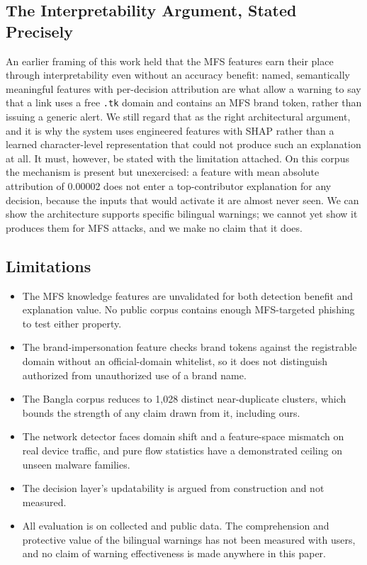 \documentclass[preprint,12pt,number]{elsarticle}
\begin{document}
\subsection{The Interpretability Argument, Stated Precisely}
An earlier framing of this work held that the MFS features earn their place through interpretability even without an accuracy benefit: named, semantically meaningful features with per-decision attribution are what allow a warning to say that a link uses a free \texttt{.tk} domain and contains an MFS brand token, rather than issuing a generic alert. We still regard that as the right architectural argument, and it is why the system uses engineered features with SHAP rather than a learned character-level representation that could not produce such an explanation at all. It must, however, be stated with the limitation attached. On this corpus the mechanism is present but unexercised: a feature with mean absolute attribution of 0.00002 does not enter a top-contributor explanation for any decision, because the inputs that would activate it are almost never seen. We can show the architecture supports specific bilingual warnings; we cannot yet show it produces them for MFS attacks, and we make no claim that it does.

\subsection{Limitations}
\begin{itemize}
\item The MFS knowledge features are unvalidated for both detection benefit and explanation value. No public corpus contains enough MFS-targeted phishing to test either property.
\item The brand-impersonation feature checks brand tokens against the registrable domain without an official-domain whitelist, so it does not distinguish authorized from unauthorized use of a brand name.
\item The Bangla corpus reduces to 1{,}028 distinct near-duplicate clusters, which bounds the strength of any claim drawn from it, including ours.
\item The network detector faces domain shift and a feature-space mismatch on real device traffic, and pure flow statistics have a demonstrated ceiling on unseen malware families.
\item The decision layer's updatability is argued from construction and not measured.
\item All evaluation is on collected and public data. The comprehension and protective value of the bilingual warnings has not been measured with users, and no claim of warning effectiveness is made anywhere in this paper.
\end{itemize}
\end{document}
